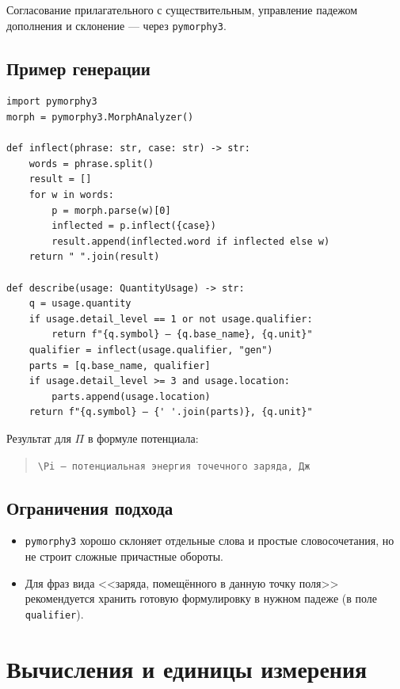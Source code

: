 \documentclass[12pt,a4paper]{article}
\newcommand{\code}[1]{\texttt{#1}}
\begin{document}
\noindent
Согласование прилагательного с существительным, управление
падежом дополнения и склонение --- через \code{pymorphy3}.

\subsection{Пример генерации}

\begin{verbatim}
import pymorphy3
morph = pymorphy3.MorphAnalyzer()

def inflect(phrase: str, case: str) -> str:
    words = phrase.split()
    result = []
    for w in words:
        p = morph.parse(w)[0]
        inflected = p.inflect({case})
        result.append(inflected.word if inflected else w)
    return " ".join(result)

def describe(usage: QuantityUsage) -> str:
    q = usage.quantity
    if usage.detail_level == 1 or not usage.qualifier:
        return f"{q.symbol} — {q.base_name}, {q.unit}"
    qualifier = inflect(usage.qualifier, "gen")
    parts = [q.base_name, qualifier]
    if usage.detail_level >= 3 and usage.location:
        parts.append(usage.location)
    return f"{q.symbol} — {' '.join(parts)}, {q.unit}"
\end{verbatim}

\noindent
Результат для \(\Pi\) в формуле потенциала:
\begin{quote}
\code{\textbackslash Pi — потенциальная энергия точечного заряда, Дж}
\end{quote}

\subsection{Ограничения подхода}

\begin{itemize}
    \item \code{pymorphy3} хорошо склоняет отдельные слова и простые
          словосочетания, но не строит сложные причастные обороты.
    \item Для фраз вида <<заряда, помещённого в данную точку поля>>
          рекомендуется хранить готовую формулировку в нужном падеже
          (в поле \code{qualifier}).
\end{itemize}

\section{Вычисления и единицы измерения}
\end{document}
